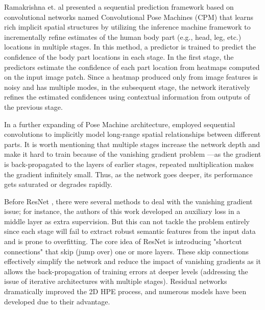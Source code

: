 Ramakrishna et. al \cite{ramakrishna_pose_2014} presented a sequential prediction framework based on convolutional networks named Convolutional Pose Machines (CPM) that learns rich implicit spatial structures by utilizing the inference machine framework to incrementally refine estimates of the human body part (e.g., head, leg, etc.) locations in multiple stages. In this method, a predictor is trained to predict the confidence of the body part locations in each stage. In the first stage, the predictors estimate the confidence of each part location from heatmaps computed on the input image patch. Since a heatmap produced only from image features is noisy and has multiple modes, in the subsequent stage, the network iteratively refines the estimated confidences using contextual information from outputs of the previous stage. 

In a further expanding of Pose Machine architecture, \cite{wei_convolutional_2016} employed sequential convolutions to implicitly model long-range spatial relationships between different parts. It is worth mentioning that multiple stages increase the network depth and make it hard to train because of the vanishing gradient problem ---as the gradient is back-propagated to the layers of earlier stages, repeated multiplication makes the gradient infinitely small. Thus, as the network goes deeper, its performance gets saturated or degrades rapidly. 

Before ResNet \cite{he_deep_2016}, there were several methods to deal with the vanishing gradient issue; for instance, the authors of this work \cite{wei_convolutional_2016} developed an auxiliary loss in a middle layer as extra supervision. But this can not tackle the problem entirely since each stage will fail to extract robust semantic features from the input data and is prone to overfitting. The core idea of ResNet is introducing "shortcut connections" that skip (jump over) one or more layers. These skip connections effectively simplify the network and reduce the impact of vanishing gradients as it allows the back-propagation of training errors at deeper levels (addressing the issue of iterative architectures with multiple stages). Residual networks dramatically improved the 2D HPE process, and numerous models
\cite{cai_learning_2020, chen_cascaded_2018, chu_multi-context_2017, ke_multi-scale_2018, liu_cascaded_2018, newell_stacked_2016, su_multi-person_2019, sun_deep_2019, xiao_simple_2018-1, yang_learning_2017} have been developed due to their advantage. 

